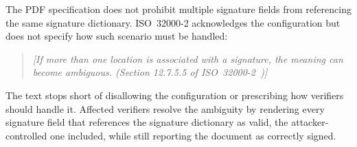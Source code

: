 \documentclass[12pt]{article}
\begin{document}
The PDF specification does not prohibit multiple signature fields from referencing the same signature dictionary. ISO~32000-2 acknowledges the configuration but does not specify how such scenario must be handled:

\begin{quote}
	\emph{[If more than one location is associated with a signature, the meaning can become ambiguous. (Section 12.7.5.5 of ISO~32000-2~\cite{iso32000-2})]}
\end{quote}


The text stops short of disallowing the configuration or prescribing how verifiers should handle it. Affected verifiers resolve the ambiguity by rendering every signature field that references the signature dictionary as valid, the attacker-controlled one included, while still reporting the document as correctly signed.
\end{document}
